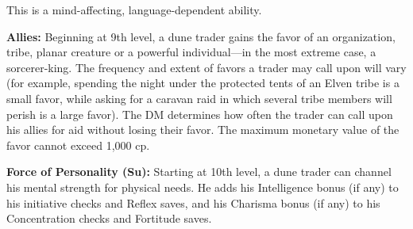 {This is a mind-affecting, language-dependent ability.

\textbf{Allies:} Beginning at 9th level, a dune trader gains the favor of an organization, tribe, planar creature or a powerful individual---in the most extreme case, a sorcerer-king. The frequency and extent of favors a trader may call upon will vary (for example, spending the night under the protected tents of an Elven tribe is a small favor, while asking for a caravan raid in which several tribe members will perish is a large favor). The DM determines how often the trader can call upon his allies for aid without losing their favor. The maximum monetary value of the favor cannot exceed 1,000 cp.

\textbf{Force of Personality (Su):} Starting at 10th level, a dune trader can channel his mental strength for physical needs. He adds his Intelligence bonus (if any) to his initiative checks and Reflex saves, and his Charisma bonus (if any) to his Concentration checks and Fortitude saves.
}

